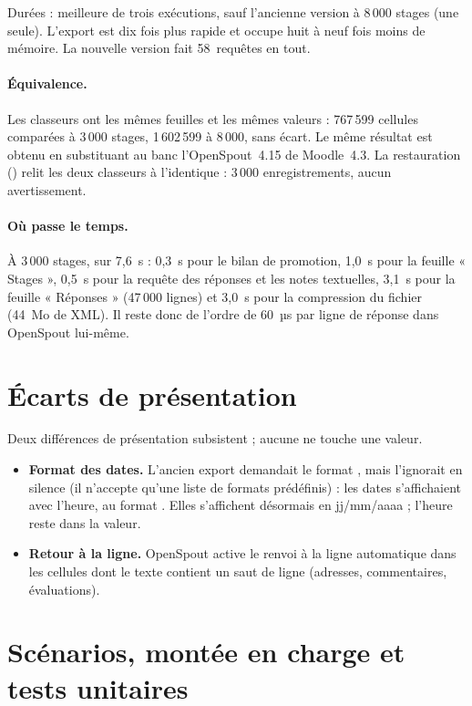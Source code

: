 \documentclass[11pt,a4paper]{article}
\begin{document}
Durées : meilleure de trois exécutions, sauf l'ancienne version à 8\,000 stages (une seule).
L'export est dix fois plus rapide et occupe huit à neuf fois moins de mémoire. La nouvelle version
fait 58~requêtes en tout.

\paragraph{Équivalence.} Les classeurs ont les mêmes feuilles et les mêmes valeurs : 767\,599
cellules comparées à 3\,000 stages, 1\,602\,599 à 8\,000, sans écart. Le même résultat est obtenu en
substituant au banc l'OpenSpout~4.15 de Moodle~4.3. La restauration
() relit les deux classeurs à l'identique : 3\,000
enregistrements, aucun avertissement.

\paragraph{Où passe le temps.} À 3\,000 stages, sur 7,6~s : 0,3~s pour le bilan de promotion,
1,0~s pour la feuille « Stages », 0,5~s pour la requête des réponses et les notes textuelles,
3,1~s pour la feuille « Réponses » (47\,000 lignes) et 3,0~s pour la compression du fichier
(44~Mo de XML). Il reste donc de l'ordre de 60~µs par ligne de réponse dans OpenSpout lui-même.

\section{Écarts de présentation}

Deux différences de présentation subsistent ; aucune ne touche une valeur.
\begin{itemize}
  \item \textbf{Format des dates.} L'ancien export demandait le format , mais
     l'ignorait en silence (il n'accepte qu'une liste de formats
    prédéfinis) : les dates s'affichaient avec l'heure, au format . Elles
    s'affichent désormais en jj/mm/aaaa ; l'heure reste dans la valeur.
  \item \textbf{Retour à la ligne.} OpenSpout active le renvoi à la ligne automatique dans les
    cellules dont le texte contient un saut de ligne (adresses, commentaires, évaluations).
\end{itemize}

\section{Scénarios, montée en charge et tests unitaires}
\end{document}
